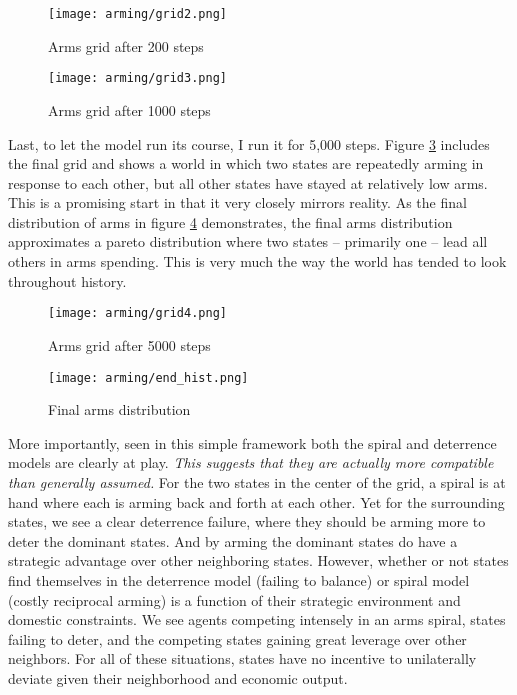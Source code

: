 \documentclass[12pt]{article}
\begin{document}
\begin{figure}
    \centering
    \texttt{[image: arming/grid2.png]}
    \caption{Arms grid after 200 steps}
    \label{grid2}
\end{figure}


\begin{figure}
    \centering
    \texttt{[image: arming/grid3.png]}
    \caption{Arms grid after 1000 steps}
    \label{grid3}
\end{figure}

Last, to let the model run its course, I run it for 5,000 steps. Figure \ref{grid4} includes the final grid and shows a world in which two states are repeatedly arming in response to each other, but all other states have stayed at relatively low arms. This is a promising start in that it very closely mirrors reality. As the final distribution of arms in figure \ref{endhist} demonstrates, the final arms distribution approximates a pareto distribution where two states -- primarily one -- lead all others in arms spending. This is very much the way the world has tended to look throughout history.

\begin{figure}
    \centering
    \texttt{[image: arming/grid4.png]}
    \caption{Arms grid after 5000 steps}
    \label{grid4}
\end{figure}

\begin{figure}
    \centering
    \texttt{[image: arming/end\_hist.png]}
    \caption{Final arms distribution}
    \label{endhist}
\end{figure}

More importantly, seen in this simple framework both the spiral and deterrence models are clearly at play. \textit{This suggests that they are actually more compatible than generally assumed.} For the two states in the center of the grid, a spiral is at hand where each is arming back and forth at each other. Yet for the surrounding states, we see a clear deterrence failure, where they should be arming more to deter the dominant states. And by arming the dominant states do have a strategic advantage over other neighboring states. However, whether or not states find themselves in the deterrence model (failing to balance) or spiral model (costly reciprocal arming) is a function of their strategic environment and domestic constraints. We see agents competing intensely in an arms spiral, states failing to deter, and the competing states gaining great leverage over other neighbors. For all of these situations, states have no incentive to unilaterally deviate given their neighborhood and economic output.
\end{document}
